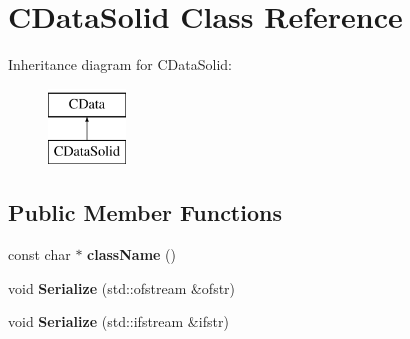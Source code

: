 \hypertarget{classCDataSolid}{\section{C\-Data\-Solid Class Reference}
\label{classCDataSolid}
}
Inheritance diagram for C\-Data\-Solid\-:\begin{figure}[H]
\begin{center}
\leavevmode
\includegraphics[height=2.000000cm]{classCDataSolid}
\end{center}
\end{figure}
\subsection*{Public Member Functions}
\begin{DoxyCompactItemize}
\item 
\hypertarget{classCDataSolid_a17f35b2e6d962e90c3ad6c0a783e87f9}{const char $\ast$ {\bfseries class\-Name} ()}\label{classCDataSolid_a17f35b2e6d962e90c3ad6c0a783e87f9}

\item 
\hypertarget{classCDataSolid_a6869d3db1ab3c8f8926813dad736f7a0}{void {\bfseries Serialize} (std\-::ofstream \&ofstr)}\label{classCDataSolid_a6869d3db1ab3c8f8926813dad736f7a0}

\item 
\hypertarget{classCDataSolid_a87a2abcd84b2cd27f86842c565d6bbe4}{void {\bfseries Serialize} (std\-::ifstream \&ifstr)}\label{classCDataSolid_a87a2abcd84b2cd27f86842c565d6bbe4}

\end{DoxyCompactItemize}
